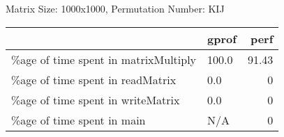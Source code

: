 \documentclass{article}
\begin{document}
    Matrix Size: 1000x1000, Permutation Number: KIJ \\
    \begin{tabular}{llr}
\hline
                                      & gprof   &   perf \\
\hline
 \%age of time spent in matrixMultiply & 100.0   &  91.43 \\
 \%age of time spent in readMatrix     & 0.0     &   0    \\
 \%age of time spent in writeMatrix    & 0.0     &   0    \\
 \%age of time spent in main           & N/A     &   0    \\
\hline
\end{tabular}
    
\end{document}

